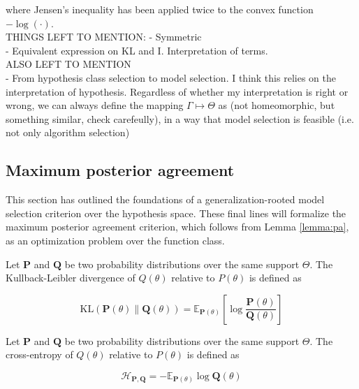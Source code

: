 where Jensen's inequality has been applied twice to the convex function $-\log(\cdot)$. \\

THINGS LEFT TO MENTION:
- Symmetric \\
- Equivalent expression on KL and I. Interpretation of terms. \\

ALSO LEFT TO MENTION \\
- From hypothesis class selection to model selection. I think this relies on the
interpretation of hypothesis. Regardless of whether my interpretation is right or wrong, we
can always define the mapping $\Gamma \longmapsto \Theta$ as (not homeomorphic, but
something similar, check carefeully), in a way that model selection is feasible (i.e. not
only algorithm selection)

\subsection{Maximum posterior agreement}

This section has outlined the foundations of a generalization-rooted model selection criterion
over the hypothesis space. These final lines will formalize the maximum posterior agreement
criterion, which follows from Lemma \ref{lemma:pa}, as an optimization problem over the function
class.

\begin{definition}
    Let $\mathbf{P}$ and $\mathbf{Q}$ be two probability distributions over the same support $\Theta$. 
    The Kullback-Leibler divergence of $Q(\theta)$ relative to $P(\theta)$ is defined as

    $$
    \text{KL}(\mathbf{P}(\theta) \parallel \mathbf{Q}(\theta)) = \mathbb{E}_{\mathbf{P}(\theta)} \left[ \log \frac{\mathbf{P}(\theta)}{\mathbf{Q}(\theta)} \right]
    $$

\end{definition} 

\begin{definition}
    Let $\mathbf{P}$ and $\mathbf{Q}$ be two probability distributions over the same support $\Theta$. 
    The cross-entropy of $Q(\theta)$ relative to $P(\theta)$ is defined as

    $$
    \mathcal{H}_{\mathbf{P}, \mathbf{Q}} = - \mathbb{E}_{\mathbf{P}(\theta)} \log \mathbf{Q}(\theta)
    $$

\end{definition}

